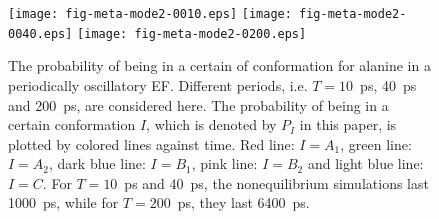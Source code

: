 \documentclass[a4paper,preprint,unsortedaddress,onecolumn]{revtex4-1}
\begin{document}
\begin{figure}
  \centering
  \texttt{[image: fig-meta-mode2-0010.eps]}
  \texttt{[image: fig-meta-mode2-0040.eps]}
  \texttt{[image: fig-meta-mode2-0200.eps]}
  \caption{The probability of being in a certain of conformation for alanine in a   periodically oscillatory EF. Different periods,
    i.e. $T=10$~ps, 40~ps and 200~ps, are considered here.  The
    probability of being in a certain conformation $I$, which is
    denoted by $P_I$ in this paper, is plotted by colored lines against
    time. Red line: $I = A_1$,  green line: $I = A_2$,  dark
    blue line: $I = B_1$,  pink line: $I = B_2$ and  light blue
    line: $I = C$. For $T=10$~ps and 40~ps, the nonequilibrium
    simulations last 1000~ps, while for $T=200$~ps,
    they last 6400~ps.  }
  \label{fig:tmp9}
\end{figure}
\end{document}
